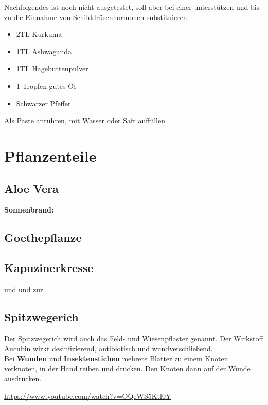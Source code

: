 Nachfolgendes ist noch nicht ausgetestet, soll aber bei einer  unterstützen und bis zu die Einnahme von Schilddrüsenhormonen substituieren.

\begin{itemize}
	\item 2TL Kurkuma
	\item 1TL Ashwaganda
	\item 1TL Hagebuttenpulver
	\item 1 Tropfen gutes Öl
	\item Schwarzer Pfeffer
\end{itemize}

Als Paste anrühren, mit Wasser oder Saft auffüllen



\section{Pflanzenteile}


\subsection{Aloe Vera}

\textbf{Sonnenbrand:}


\subsection{Goethepflanze}


\subsection{Kapuzinerkresse}

 und  und zur 


\subsection{Spitzwegerich}

Der Spitzwegerich wird auch das Feld- und Wiesenpflaster genannt. Der Wirkstoff Aucubin wirkt desinfizierend, antibiotisch und wundverschließend.\\
Bei \textbf{Wunden} und \textbf{Insektenstichen} mehrere Blätter zu einem Knoten verknoten, in der Hand reiben und drücken. Den Knoten dann auf der Wunde ausdrücken. 

\cite{swrhandwerkskunst}  

\url{https://www.youtube.com/watch?v=OQeWS5Ktl0Y}



